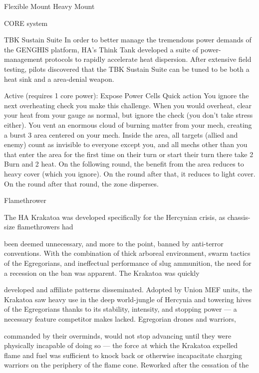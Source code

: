Flexible Mount                                        Heavy Mount 

                                               CORE system 

                                            TBK Sustain Suite 
In order to better manage the tremendous power demands of the GENGHIS platform, HA’s Think Tank 
developed a suite of power-management protocols to rapidly accelerate heat dispersion. After extensive 
field testing, pilots discovered that the TBK Sustain Suite can be tuned to be both a heat sink and a 
area-denial weapon. 

Active (requires 1 core power): Expose Power Cells 
Quick action 
You ignore the next overheating check you make this challenge. When you would overheat, clear your 
heat from your gauge as normal, but ignore the check (you don’t take stress either). You vent an 
enormous cloud of burning matter from your mech, creating a burst 3 area centered on your mech. 
Inside the area, all targets (allied and enemy) count as invisible to everyone except you, and all mechs 
other than you that enter the area for the first time on their turn or start their turn there take 2 Burn and 
2 heat. 
On the following round, the benefit from the area reduces to heavy cover (which you ignore). On the 
round after that, it reduces to light cover. On the round after that round, the zone disperses. 

                                                                                                           


Flamethrower  

The HA Krakatoa was developed specifically for the Hercynian crisis, as chassis-size flamethrowers had  

been deemed unnecessary, and more to the point, banned by anti-terror conventions. With the  
combination of thick arboreal environment, swarm tactics of the Egregorians, and ineffectual performance  
of slug ammunition, the need for a recession on the ban was apparent. The Krakatoa was quickly  

developed and affiliate patterns disseminated. Adopted by Union MEF units, the Krakatoa saw heavy use in  
the deep world-jungle of Hercynia and towering hives of the Egregorians thanks to its stability, intensity,  
and stopping power — a necessary feature competitor makes lacked. Egregorian drones and warriors,  

commanded by their overminds, would not stop advancing until they were physically incapable of doing so  
— the force at which the Krakatoa expelled flame and fuel was sufficient to knock back or otherwise  
incapacitate charging warriors on the periphery of the flame cone. Reworked after the cessation of the  

